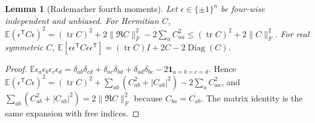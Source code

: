 \documentclass[11pt,a4paper]{article}
\newtheorem{lemma}[theorem]{Lemma}
\theoremstyle{definition}
\theoremstyle{remark}
\numberwithin{equation}{section}
\newcommand{\E}{\mathbb E}
\newcommand{\tr}{\operatorname{tr}}
\newcommand{\Diag}{\operatorname{Diag}}
\newcommand{\norm}[1]{\lVert#1\rVert}
\begin{document}
\begin{lemma}[Rademacher fourth moments]\label{lem:rad4}
Let $\epsilon\in\{\pm1\}^n$ be four-wise independent and unbiased. For
Hermitian $C$,
$\E(\epsilon^{\mathsf T}C\epsilon)^2=(\tr C)^2+2\norm{\Re C}_F^2-2\sum_aC_{aa}^2
\le(\tr C)^2+2\norm C_F^2$. For real symmetric $C$,
$\E[\epsilon\epsilon^{\mathsf T}C\epsilon\epsilon^{\mathsf T}]=(\tr C)I+2C-2\Diag(C)$.
\end{lemma}
\begin{proof}
$\E\epsilon_a\epsilon_b\epsilon_c\epsilon_d=\delta_{ab}\delta_{cd}+\delta_{ac}\delta_{bd}
+\delta_{ad}\delta_{bc}-2\mathbf 1_{a=b=c=d}$. Hence
$\E(\epsilon^{\mathsf T}C\epsilon)^2=(\tr C)^2+\sum_{ab}(C_{ab}^2+|C_{ab}|^2)-2\sum_aC_{aa}^2$,
and $\sum_{ab}(C_{ab}^2+|C_{ab}|^2)=2\norm{\Re C}_F^2$ because $C_{ba}=\overline{C_{ab}}$.
The matrix identity is the same expansion with free indices.
\end{proof}
\end{document}
